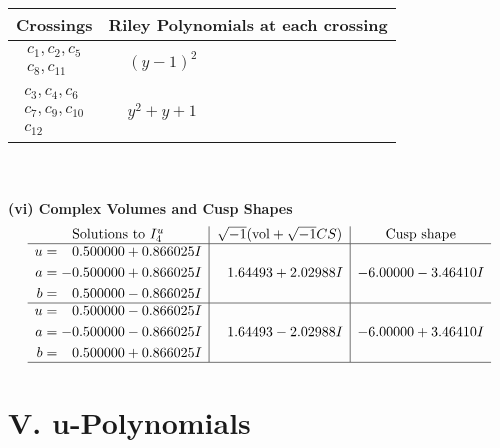 \documentclass[1p]{elsarticle_modified}
\theoremstyle{definition}
\newcommand{\I}{\sqrt{-1}}
\begin{document}
\begin{tabular}{m{50pt}|m{274pt}}
Crossings & \hspace{64pt}Riley Polynomials at each crossing \\
\hline $$\begin{aligned}c_{1},c_{2},c_{5}\\c_{8},c_{11}\end{aligned}$$&$\begin{aligned}
&(y-1)^2
\end{aligned}$\\
\hline $$\begin{aligned}c_{3},c_{4},c_{6}\\c_{7},c_{9},c_{10}\\c_{12}\end{aligned}$$&$\begin{aligned}
&y^2+y+1
\end{aligned}$\\
\hline
\end{tabular}\\~\\
\newpage\flushleft \textbf{(vi) Complex Volumes and Cusp Shapes}
$$\begin{array}{c|c|c}  
\text{Solutions to }I^u_{4}& \I (\text{vol} + \sqrt{-1}CS) & \text{Cusp shape}\\
 \hline 
\begin{aligned}
u &= \phantom{-}0.500000 + 0.866025 I \\
a &= -0.500000 + 0.866025 I \\
b &= \phantom{-}0.500000 - 0.866025 I\end{aligned}
 & \phantom{-}1.64493 + 2.02988 I & -6.00000 - 3.46410 I \\ \hline\begin{aligned}
u &= \phantom{-}0.500000 - 0.866025 I \\
a &= -0.500000 - 0.866025 I \\
b &= \phantom{-}0.500000 + 0.866025 I\end{aligned}
 & \phantom{-}1.64493 - 2.02988 I & -6.00000 + 3.46410 I\\
 \hline 
 \end{array}$$\newpage
\newpage\renewcommand{\arraystretch}{1}
\centering \section*{ V. u-Polynomials}
\end{document}
